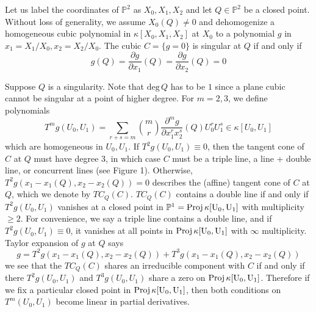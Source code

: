 \documentclass[12pt]{article}
\theoremstyle{plain}
\theoremstyle{definition}
\newcommand{\IA}{\mathbb{A}}
\newcommand{\IP}{\mathbb{P}}
\newcommand{\sT}{\mathcal{T}}
\renewcommand{\deg}{\mathrm{deg}\,}
\newcommand{\Proj}{\rm Proj\,}
\newcommand{\<}{\langle}
\renewcommand{\>}{\rangle}
\newcommand{\p}{\partial}
\begin{document}
Let us label the coordinates of $\IP^2$ as $X_0, X_1, X_2$ and let $Q \in \IP^2$ be a closed point. Without loss of generality, we assume $X_0(Q) \neq 0$ and dehomogenize a homogeneous cubic polynomial in $\kappa[X_0, X_1, X_2]$ at $X_0$ to a polynomial $g$ in $x_1 = X_1/X_0, x_2 = X_2/X_0$. The cubic $C = \{g = 0\}$ is singular at $Q$ if and only if 
$$ g(Q) = \frac{\p g}{\p x_1} (Q) = \frac{\p g}{\p x_2}(Q) = 0$$

Suppose $Q$ is a singularity. Note that $\deg Q$ has to be $1$ since a plane cubic cannot be singular at a point of higher degree. %
For $m = 2, 3$, we define polynomials 
$$ T^m g(U_0, U_1) = \sum_{r + s = m} {m \choose r} \frac{\p^m g}{\p x_1^r x_2^s}(Q) U_0^r U_1^s \in \kappa[U_0, U_1]$$
which are homogeneous in $U_0, U_1$. If $T^2 g(U_0, U_1) \equiv 0$, then the tangent cone of $C$ at $Q$ must have degree $3$, in which case $C$ must be a triple line, a line + double line, or concurrent lines (see Figure 1). Otherwise, $T^2 g(x_1 - x_1(Q), x_2 - x_2(Q)) = 0$ describes the (affine) tangent cone of $C$ at $Q$, which we denote by $TC_Q(C)$. $TC_Q(C)$ contains a double line if and only if $T^2 g(U_0, U_1)$ vanishes at a closed point in $\IP^1 = \Proj \kappa[U_0, U_1]$ with multiplicity $\ge 2$. For convenience, we say a triple line contains a double line, and if $T^2 g(U_0, U_1) \equiv 0$, it vanishes at all points in $\Proj \kappa[U_0, U_1]$ with $\infty$ multiplicity. Taylor expansion of $g$ at $Q$ says
$$ g = T^2 g(x_1 - x_1(Q), x_2 - x_2(Q)) + T^3 g(x_1 - x_1(Q), x_2 - x_2(Q)) $$
we see that the $TC_Q(C)$ shares an irreducible component with $C$ if and only if there $T^2 g(U_0, U_1)$ and $T^3 g(U_0, U_1)$ share a zero on $\Proj \kappa[U_0, U_1]$. Therefore if we fix a particular closed point in $\Proj \kappa[U_0, U_1]$, then both conditions on $T^m(U_0, U_1)$ become linear in partial derivatives.
\end{document}
